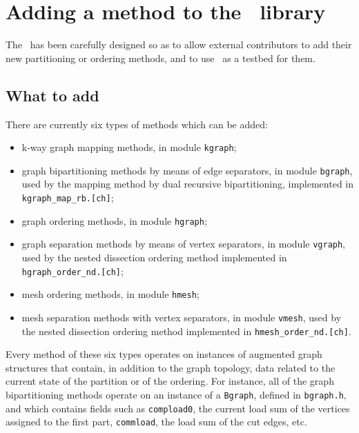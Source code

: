 
\section{Adding a method to the \libscotch\ library}
\label{sec-method}

The \libscotch\ has been carefully designed so as to allow external
contributors to add their new partitioning or ordering methods, and
to use \scotch\ as a testbed for them.

\subsection{What to add}

There are currently six types of methods which can be added:
\begin{itemize}
\item
k-way graph mapping methods, in module \texttt{kgraph};
\item
graph bipartitioning methods by means of edge separators, in module
\texttt{bgraph}, used by the mapping method by dual recursive
bipartitioning, implemented in \texttt{kgraph\_\lbt map\_\lbt rb.[ch]};
\item
graph ordering methods, in module \texttt{hgraph};
\item
graph separation methods by means of vertex separators, in module
\texttt{vgraph}, used by the nested dissection ordering method
implemented in \texttt{hgraph\_\lbt order\_\lbt nd.[ch]};
\item
mesh ordering methods, in module \texttt{hmesh};
\item
mesh separation methods with vertex separators, in module
\texttt{vmesh}, used by the nested dissection ordering method
implemented in \texttt{hmesh\_\lbt order\_\lbt nd.[ch]}.
\end{itemize}
Every method of these six types operates on instances of augmented
graph structures that contain, in addition to the graph topology,
data related to the current state of the partition or of the
ordering. For instance, all of the graph bipartitioning methods
operate on an instance of a \texttt{Bgraph}, defined in \texttt{bgraph.h},
and which contains fields such as \texttt{compload0}, the current load
sum of the vertices assigned to the first part, \texttt{commload}, the
load sum of the cut edges, etc.

